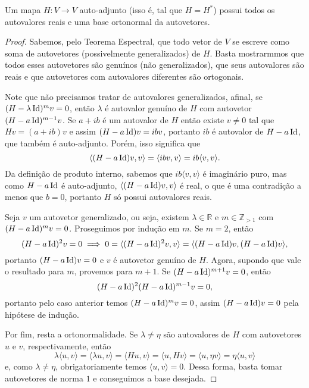 \begin{theorem}
    Um mapa $H \colon V \to V$ auto-adjunto (isso é, tal que $H = H^*$) possui todos os autovalores reais e uma base ortonormal da autovetores.
\end{theorem}
\begin{proof}
    Sabemos, pelo Teorema Espectral, que todo vetor de $V$ se escreve como soma de autovetores (possivelmente generalizados) de $H$. Basta mostrarmmos que todos esses autovetores são genuínos (não generalizados), que seus autovalores são reais e que autovetores com autovalores diferentes são ortogonais.

    Note que não precisamos tratar de autovalores generalizados, afinal, se $(H - \lambda\operatorname{Id})^mv = 0$, então $\lambda$ é autovalor genuíno de $H$ com autovetor $(H - a\operatorname{Id})^{m-1}v$. Se $a + ib$ é um autovalor de $H$ então existe $v \neq 0$ tal que $Hv  = (a+ib)v$ e assim $(H - a\operatorname{Id})v = ibv$, portanto $ib$ é autovalor de $H - a\operatorname{Id}$, que também é auto-adjunto. Porém, isso significa que \begin{equation}
        \langle (H - a\operatorname{Id})v, v \rangle = \langle ibv, v \rangle = ib\langle v, v \rangle.
    \end{equation} Da definição de produto interno, sabemos que $ib \langle v, v \rangle$ é imaginário puro, mas como $H - a\operatorname{Id}$ é auto-adjunto, $\langle (H - a\operatorname{Id})v, v \rangle$ é real, o que é uma contradição a menos que $b = 0$, portanto $H$ só possui autovalores reais.

    Seja $v$ um autovetor generalizado, ou seja, existem $\lambda \in \mathbb{R}$ e $m \in \mathbb{Z}_{>1}$ com $(H - a\operatorname{Id})^mv = 0$. Proseguimos por indução em $m$. Se $m = 2$, então \begin{equation}
        (H - a\operatorname{Id})^2v = 0 \implies 0 = \langle (H - a\operatorname{Id})^2v, v \rangle = \langle (H - a\operatorname{Id})v, (H - a\operatorname{Id})v\rangle,
    \end{equation} portanto $(H - a\operatorname{Id})v = 0$ e $v$ é autovetor genuíno de $H$. Agora, supondo que vale o resultado para $m$, provemos para $m+1$. Se $(H - a\operatorname{Id})^{m+1}v = 0$, então \begin{equation}
        (H - a\operatorname{Id})^2(H - a\operatorname{Id})^{m-1}v = 0,
    \end{equation} portanto pelo caso anterior temos $(H - a\operatorname{Id})^mv = 0$, assim $(H - a\operatorname{Id})v = 0$ pela hipótese de indução.

    Por fim, resta a ortonormalidade. Se $\lambda \neq \eta$ são autovalores de $H$ com autovetores $u$ e $v$, respectivamente, então \begin{equation}
        \lambda\langle u, v \rangle = \langle \lambda u, v \rangle = \langle Hu, v \rangle = \langle u, Hv \rangle = \langle u, \eta v \rangle = \eta \langle u, v \rangle
    \end{equation} e, como $\lambda \neq \eta$, obrigatoriamente temos $\langle u, v \rangle = 0$. Dessa forma, basta tomar autovetores de norma $1$ e conseguimos a base desejada.
\end{proof}

